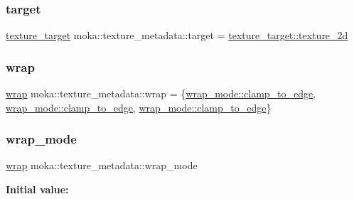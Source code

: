 \subsubsection{\texorpdfstring{target}{target}}
{\footnotesize\ttfamily \mbox{\hyperlink{namespacemoka_a259bf395c8f07bd8d13515efcb542623}{texture\+\_\+target}} moka\+::texture\+\_\+metadata\+::target = \mbox{\hyperlink{namespacemoka_a259bf395c8f07bd8d13515efcb542623ade86992194d08494a0a0e208a3660f31}{texture\+\_\+target\+::texture\+\_\+2d}}}

\mbox{\label{structmoka_1_1texture__metadata_a748e2dbf4726ea803d5fc521ca809d8e}} 
\subsubsection{\texorpdfstring{wrap}{wrap}}
{\footnotesize\ttfamily \mbox{\hyperlink{structmoka_1_1wrap}{wrap}} moka\+::texture\+\_\+metadata\+::wrap = \{\mbox{\hyperlink{namespacemoka_afda3faa87bacaacc6008d8c1f73f6462a7ff5ead6fef18ca5f63119754ac76c3e}{wrap\+\_\+mode\+::clamp\+\_\+to\+\_\+edge}}, \mbox{\hyperlink{namespacemoka_afda3faa87bacaacc6008d8c1f73f6462a7ff5ead6fef18ca5f63119754ac76c3e}{wrap\+\_\+mode\+::clamp\+\_\+to\+\_\+edge}}, \mbox{\hyperlink{namespacemoka_afda3faa87bacaacc6008d8c1f73f6462a7ff5ead6fef18ca5f63119754ac76c3e}{wrap\+\_\+mode\+::clamp\+\_\+to\+\_\+edge}}\}}

\mbox{\label{structmoka_1_1texture__metadata_ab21e86d7633933cd69cf73c2df3a497d}} 
\subsubsection{\texorpdfstring{wrap\_mode}{wrap\_mode}}
{\footnotesize\ttfamily \mbox{\hyperlink{structmoka_1_1wrap}{wrap}} moka\+::texture\+\_\+metadata\+::wrap\+\_\+mode}

{\bfseries Initial value\+:}
\begin{DoxyCode}{0}
\DoxyCodeLine{= \{}

\end{DoxyCode}


